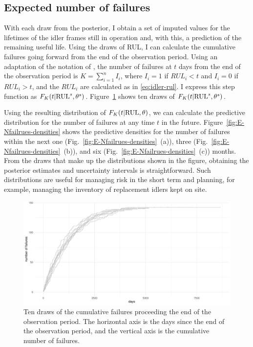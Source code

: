 \subsection{Expected number of failures} \label{subsec:idler-cumulative-failrues}

With each draw from the posterior, I obtain a set of imputed values for the lifetimes of the idler frames still in operation and, with this, a prediction of the remaining useful life. Using the draws of RUL, I can calculate the cumulative failures going forward from the end of the observation period. Using an adaptation of the notation of \citet[sec.~6]{hong2009}, the number of failures at $t$ days from the end of the observation period is $K = \sum^{n}_{i = 1}I_i$, where $I_i = 1$ if $RUL_i < t$ and $I_i = 0$ if $RUL_i > t$, and the $RUL_i$ are calculated as in \eqref{eq:idler-rul}. I express this step function as $F_K(t|\hbox{RUL}^s, \theta^s)$. Figure~\ref{fig:E-Nfailrues-draws} shows ten draws of $F_K(t|\hbox{RUL}^s, \theta^s)$.

Using the resulting distribution of $F_K(t|\hbox{RUL}, \theta)$, we can calculate the predictive distribution for the number of failures at any time $t$ in the future. Figure~\ref{fig:E-Nfailrues-densities} shows the predictive densities for the number of failures within the next one (Fig.~\ref{fig:E-Nfailrues-densities}~(a)), three (Fig.~\ref{fig:E-Nfailrues-densities}~(b)), and six (Fig.~\ref{fig:E-Nfailrues-densities}~(c)) months. From the draws that make up the distributions shown in the figure, obtaining the posterior estimates and uncertainty intervals is straightforward. Such distributions are useful for managing risk in the short term and planning, for example, managing the inventory of replacement idlers kept on site.

\begin{figure}
  \centering
  \includegraphics[width=1\textwidth]{./figures/ch-3/E-n-failures-draws.pdf}
  \caption{Ten draws of the cumulative failures proceeding the end of the observation period. The horizontal axis is the days since the end of the observation period, and the vertical axis is the cumulative number of failures.}
  \label{fig:E-Nfailrues-draws}
\end{figure}

